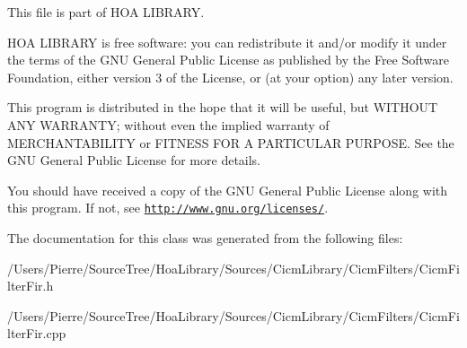 This file is part of H\-O\-A L\-I\-B\-R\-A\-R\-Y.

H\-O\-A L\-I\-B\-R\-A\-R\-Y is free software\-: you can redistribute it and/or modify it under the terms of the G\-N\-U General Public License as published by the Free Software Foundation, either version 3 of the License, or (at your option) any later version.

This program is distributed in the hope that it will be useful, but W\-I\-T\-H\-O\-U\-T A\-N\-Y W\-A\-R\-R\-A\-N\-T\-Y; without even the implied warranty of M\-E\-R\-C\-H\-A\-N\-T\-A\-B\-I\-L\-I\-T\-Y or F\-I\-T\-N\-E\-S\-S F\-O\-R A P\-A\-R\-T\-I\-C\-U\-L\-A\-R P\-U\-R\-P\-O\-S\-E. See the G\-N\-U General Public License for more details.

You should have received a copy of the G\-N\-U General Public License along with this program. If not, see \href{http://www.gnu.org/licenses/}{\tt http\-://www.\-gnu.\-org/licenses/}. 

The documentation for this class was generated from the following files\-:\begin{DoxyCompactItemize}
\item 
/\-Users/\-Pierre/\-Source\-Tree/\-Hoa\-Library/\-Sources/\-Cicm\-Library/\-Cicm\-Filters/Cicm\-Filter\-Fir.\-h\item 
/\-Users/\-Pierre/\-Source\-Tree/\-Hoa\-Library/\-Sources/\-Cicm\-Library/\-Cicm\-Filters/Cicm\-Filter\-Fir.\-cpp\end{DoxyCompactItemize}

